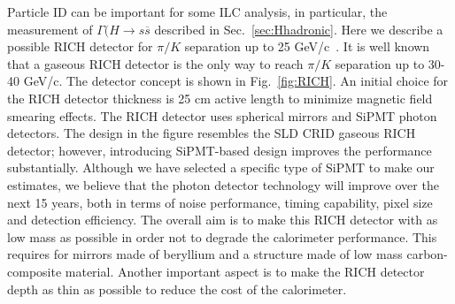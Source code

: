 Particle ID can be important for some ILC analysis, in particular, the measurement of $\Gamma(H\to s\overline{s}$ described in Sec.~\ref{sec:Hhadronic}.  Here we describe a  possible RICH detector for $\pi/K$ separation  up to 25 GeV/c~\cite{CairoVavra}. It is well known that a gaseous RICH detector is the only way to reach $\pi/K$ separation up to 30-40 GeV/c. The detector concept is shown in Fig.~\ref{fig:RICH}. An initial choice for the RICH detector thickness is 25 cm active length to minimize magnetic field smearing effects. The RICH detector uses spherical mirrors and SiPMT  photon detectors. The design in the figure resembles the SLD CRID gaseous RICH detector; however, introducing SiPMT-based design improves the performance substantially. Although we have selected a specific type of SiPMT to make our estimates, we believe that the photon detector technology will improve over the next 15 years, both in terms of noise performance, timing capability, pixel size and detection efficiency. The overall aim is to make this RICH detector with as low mass as possible in order not to degrade the calorimeter
performance. This requires for mirrors made of beryllium and a structure made of low mass carbon-composite material. Another important aspect is to make the RICH detector depth as thin as possible to reduce the cost of the calorimeter. 

